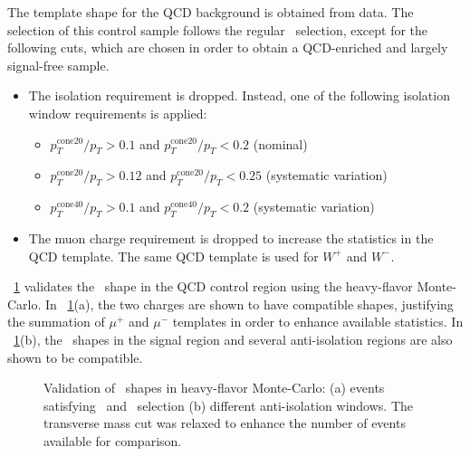 The template shape for the QCD background is obtained from data. The selection of this control sample follows the regular \Wmn\ selection, except for the following cuts, which are chosen in order to obtain a QCD-enriched and largely signal-free sample.

\begin{itemize}
\item The isolation requirement is dropped. Instead, one of the following isolation window requirements is applied:
\begin{itemize}
\item $p_T^{\mbox{cone20}} / p_T > 0.1$ and $p_T^{\mbox{cone20}} / p_T < 0.2$ (nominal)
\item $p_T^{\mbox{cone20}} / p_T > 0.12$ and $p_T^{\mbox{cone20}} / p_T < 0.25$ (systematic variation)
\item $p_T^{\mbox{cone40}} / p_T > 0.1$ and $p_T^{\mbox{cone40}} / p_T < 0.2$ (systematic variation)
\end{itemize}
\item The muon charge requirement is dropped to increase the statistics in the QCD template. The same QCD template is used for $W^+$ and $W^-$.
\end{itemize}

\Fig~\ref{fig:Wmunu:qcd_val_shape} validates the \MET\ shape in the QCD control region using the heavy-flavor Monte-Carlo. In \Fig~\ref{fig:Wmunu:qcd_val_shape}(a), the two charges are shown to have compatible shapes, justifying the summation of $\mu^{+}$ and $\mu^{-}$ templates in order to enhance available statistics. In \Fig~\ref{fig:Wmunu:qcd_val_shape}(b), the \MET\ shapes in the signal region and several anti-isolation regions are also shown to be compatible.

\begin{figure}[phtb]
  \begin{center}
 \caption{ Validation of \MET\ shapes in heavy-flavor Monte-Carlo:
 (a) events satisfying \Wmunup\ and \Wmunum\ selection
 (b) different anti-isolation windows.
 The transverse mass cut was relaxed to enhance the number of events available for comparison. }
 \label{fig:Wmunu:qcd_val_shape}
 \end{center}
\end{figure}

